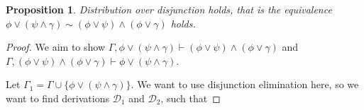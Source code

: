 \documentclass[titlepage]{article}
\newtheorem{proposition}{Proposition}
\begin{document}
\begin{proposition}\label{disj-dist}
    Distribution over disjunction holds, that is the equivalence $\phi \vee (\psi \wedge \gamma) \sim (\phi \vee \psi) \wedge (\phi \vee \gamma)$ holds.
\end{proposition}

\begin{proof}
    We aim to show $\Gamma, \phi \vee (\psi \wedge \gamma) \vdash (\phi \vee \psi) \wedge (\phi \vee \gamma)$ and $\Gamma, (\phi \vee \psi) \wedge (\phi \vee \gamma) \vdash \phi \vee (\psi \wedge \gamma)$. 
    
    Let $\Gamma_1 = \Gamma \cup \{\phi \vee (\psi \wedge \gamma)\}$. We want to use disjunction elimination here, so we want to find derivations $\mathcal{D}_1$ and $\mathcal{D}_2$, such that


\end{proof}
\end{document}
